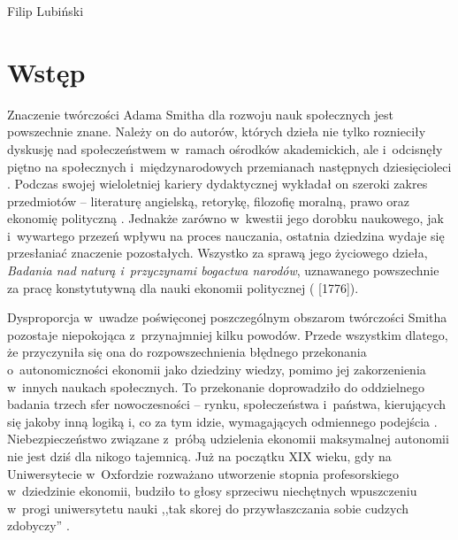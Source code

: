 \begin{artplenv}{Filip Lubiński}
\section*{Wstęp}
\lettrine[loversize=0.13,lines=2,lraise=-0.05,nindent=0em,findent=0.2pt]%
{Z}{}naczenie twórczości Adama Smitha dla rozwoju nauk społecznych jest powszechnie znane. Należy on do autorów, których
dzieła nie tylko roznieciły dyskusję nad społeczeństwem w~ramach ośrodków akademickich, ale i~odcisnęły piętno na
społecznych i~międzynarodowych przemianach następnych dziesięcioleci
\parencite[s.~12]{milgate_after_2009}.
Podczas swojej wieloletniej kariery dydaktycznej wykładał on szeroki zakres przedmiotów -- literaturę angielską,
retorykę, filozofię moralną, prawo oraz ekonomię polityczną
\parencite[s.~126]{roncaglia_wealth_2005}.
Jednakże zarówno w~kwestii jego dorobku naukowego, jak i~wywartego przezeń wpływu na proces nauczania, ostatnia
dziedzina wydaje się przesłaniać znaczenie pozostałych. Wszystko za sprawą jego życiowego dzieła, \textit{Badania nad
naturą i~przyczynami bogactwa narodów}, uznawanego powszechnie za pracę konstytutywną dla nauki ekonomii politycznej
(\cite{smith_badania_2007} [1776]).

Dysproporcja w~uwadze poświęconej poszczególnym obszarom twórczości Smitha pozostaje niepokojąca z~przynajmniej
kilku powodów. Przede wszystkim dlatego, że przyczyniła się ona do rozpowszechnienia błędnego
przekonania o~autonomiczności ekonomii jako dziedziny wiedzy, pomimo jej zakorzenienia w~innych naukach społecznych.
To przekonanie
doprowadziło do oddzielnego badania trzech sfer nowoczesności -- rynku, społeczeństwa i~państwa, kierujących się jakoby
inną logiką i, co za tym idzie, wymagających odmiennego podejścia
\parencite[s.~19]{wallerstein_analiza_2007}.
Niebezpieczeństwo związane z~próbą udzielenia ekonomii maksymalnej autonomii nie jest dziś dla nikogo tajemnicą. Już na
początku XIX wieku, gdy na Uniwersytecie w~Oxfordzie rozważano utworzenie stopnia profesorskiego w~dziedzinie ekonomii,
budziło to głosy sprzeciwu niechętnych wpuszczeniu w~progi uniwersytetu nauki ,,tak skorej do przywłaszczania sobie
cudzych zdobyczy''
\parencite[s.~54]{schumacher_male_1981}.


\end{artplenv}

